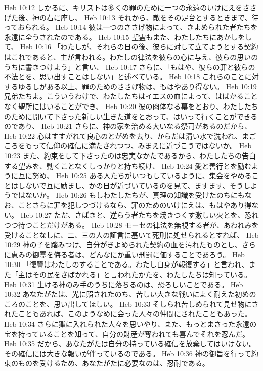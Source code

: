 Heb 10:12  しかるに、キリストは多くの罪のために一つの永遠のいけにえをささげた後、神の右に座し、
Heb 10:13  それから、敵をその足台とするときまで、待っておられる。
Heb 10:14  彼は一つのささげ物によって、きよめられた者たちを永遠に全うされたのである。
Heb 10:15  聖霊もまた、わたしたちにあかしをして、
Heb 10:16  「わたしが、それらの日の後、彼らに対して立てようとする契約はこれであると、主が言われる。わたしの律法を彼らの心に与え、彼らの思いのうちに書きつけよう」と言い、
Heb 10:17  さらに、「もはや、彼らの罪と彼らの不法とを、思い出すことはしない」と述べている。
Heb 10:18  これらのことに対するゆるしがある以上、罪のためのささげ物は、もはやあり得ない。
Heb 10:19  兄弟たちよ。こういうわけで、わたしたちはイエスの血によって、はばかることなく聖所にはいることができ、
Heb 10:20  彼の肉体なる幕をとおり、わたしたちのために開いて下さった新しい生きた道をとおって、はいって行くことができるのであり、
Heb 10:21  さらに、神の家を治める大いなる祭司があるのだから、
Heb 10:22  心はすすがれて良心のとがめを去り、からだは清い水で洗われ、まごころをもって信仰の確信に満たされつつ、みまえに近づこうではないか。
Heb 10:23  また、約束をして下さったのは忠実なかたであるから、わたしたちの告白する望みを、動くことなくしっかりと持ち続け、
Heb 10:24  愛と善行とを励むように互に努め、
Heb 10:25  ある人たちがいつもしているように、集会をやめることはしないで互に励まし、かの日が近づいているのを見て、ますます、そうしようではないか。
Heb 10:26  もしわたしたちが、真理の知識を受けたのちにもなお、ことさらに罪を犯しつづけるなら、罪のためのいけにえは、もはやあり得ない。
Heb 10:27  ただ、さばきと、逆らう者たちを焼きつくす激しい火とを、恐れつつ待つことだけがある。
Heb 10:28  モーセの律法を無視する者が、あわれみを受けることなしに、二、三の人の証言に基いて死刑に処せられるとすれば、
Heb 10:29  神の子を踏みつけ、自分がきよめられた契約の血を汚れたものとし、さらに恵みの御霊を侮る者は、どんなにか重い刑罰に価することであろう。
Heb 10:30  「復讐はわたしのすることである。わたし自身が報復する」と言われ、また「主はその民をさばかれる」と言われたかたを、わたしたちは知っている。
Heb 10:31  生ける神のみ手のうちに落ちるのは、恐ろしいことである。
Heb 10:32  あなたがたは、光に照されたのち、苦しい大きな戦いによく耐えた初めのころのことを、思い出してほしい。
Heb 10:33  そしられ苦しめられて見せ物にされたこともあれば、このようなめに会った人々の仲間にされたこともあった。
Heb 10:34  さらに獄に入れられた人々を思いやり、また、もっとまさった永遠の宝を持っていることを知って、自分の財産が奪われても喜んでそれを忍んだ。
Heb 10:35  だから、あなたがたは自分の持っている確信を放棄してはいけない。その確信には大きな報いが伴っているのである。
Heb 10:36  神の御旨を行って約束のものを受けるため、あなたがたに必要なのは、忍耐である。
